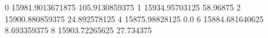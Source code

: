 0 15981.9013671875 105.9130859375
1 15934.95703125 58.96875
2 15900.880859375 24.892578125
4 15875.98828125 0.0
6 15884.681640625 8.693359375
8 15903.72265625 27.734375
